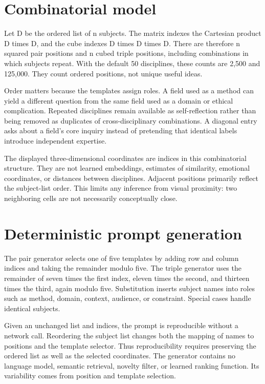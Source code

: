 \documentclass[manuscript,screen,nonacm]{acmart}
\begin{document}
\section{Combinatorial model}

Let D be the ordered list of n subjects. The matrix indexes the Cartesian product D times D, and the cube indexes D times D times D. There are therefore n squared pair positions and n cubed triple positions, including combinations in which subjects repeat. With the default 50 disciplines, these counts are 2,500 and 125,000. They count ordered positions, not unique useful ideas.

Order matters because the templates assign roles. A field used as a method can yield a different question from the same field used as a domain or ethical complication. Repeated disciplines remain available as self-reflection rather than being removed as duplicates of cross-disciplinary combinations. A diagonal entry asks about a field's core inquiry instead of pretending that identical labels introduce independent expertise.

The displayed three-dimensional coordinates are indices in this combinatorial structure. They are not learned embeddings, estimates of similarity, emotional coordinates, or distances between disciplines. Adjacent positions primarily reflect the subject-list order. This limits any inference from visual proximity: two neighboring cells are not necessarily conceptually close.

\section{Deterministic prompt generation}

The pair generator selects one of five templates by adding row and column indices and taking the remainder modulo five. The triple generator uses the remainder of seven times the first index, eleven times the second, and thirteen times the third, again modulo five. Substitution inserts subject names into roles such as method, domain, context, audience, or constraint. Special cases handle identical subjects.

Given an unchanged list and indices, the prompt is reproducible without a network call. Reordering the subject list changes both the mapping of names to positions and the template selector. Thus reproducibility requires preserving the ordered list as well as the selected coordinates. The generator contains no language model, semantic retrieval, novelty filter, or learned ranking function. Its variability comes from position and template selection.
\end{document}
